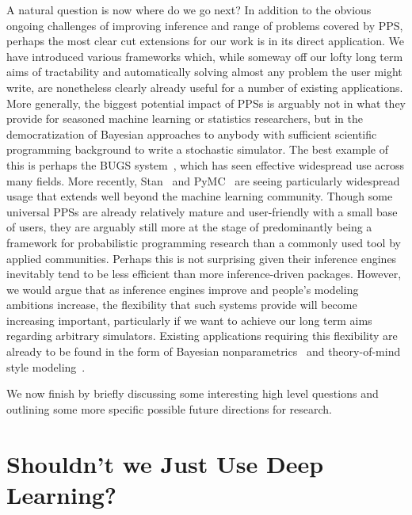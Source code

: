 A natural question is now where do we go next?  In addition to the obvious ongoing challenges
of improving inference and range of problems covered by PPS, perhaps the most clear cut 
extensions for our
work is in its direct application.  We have introduced various frameworks which, while someway off
our lofty long term aims of tractability and automatically solving almost any problem the 
user might write, are nonetheless clearly already useful for a number of existing applications.  
More generally, the biggest
potential impact of PPSs is arguably not in what they provide for seasoned machine learning or 
statistics researchers, but in the democratization of Bayesian approaches to anybody with sufficient
scientific programming background to write a stochastic simulator.  The best example of this is
perhaps the BUGS system~\cite{spiegelhalter1996bugs}, which has seen effective widespread use across
many fields.
More recently, Stan~\cite{carpenter2015stan} and PyMC~\citep{salvatier2016probabilistic} 
are seeing particularly widespread usage that extends well beyond
the machine learning community.  Though some universal PPSs are already relatively 
mature and user-friendly with a small base of users, they are arguably still more
at the stage of predominantly being a framework for probabilistic programming
research than a commonly used tool by applied communities.  Perhaps this is not surprising given
their inference engines inevitably tend to be less efficient than more inference-driven packages.
However, we would argue that as inference engines improve and people's modeling ambitions
increase, the flexibility that such systems provide will become increasing important,
particularly if we want to achieve our long term aims regarding arbitrary simulators.
Existing applications requiring this flexibility are already to be found in the form of Bayesian
nonparametrics~\citep{dhir2017interpreting} and theory-of-mind style 
modeling~\citep{stuhlmuller2014reasoning}.

We now finish by briefly discussing some interesting high level questions and 
outlining some more specific possible future directions for research. 

\section{Shouldn't we Just Use Deep Learning?}

